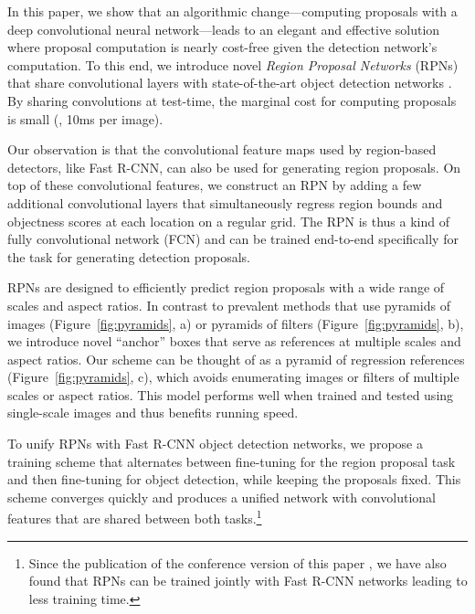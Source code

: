 \documentclass[10pt,journal,cspaper,compsoc]{IEEEtran}
\begin{document}
In this paper, we show that an algorithmic change---computing proposals with a deep convolutional neural network---leads to an elegant and effective solution where proposal computation is nearly cost-free given the detection network's computation.
To this end, we introduce novel \emph{Region Proposal Networks} (RPNs) that share convolutional layers with state-of-the-art object detection networks \cite{He2014,Girshick2015a}. By sharing convolutions at test-time, the marginal cost for computing proposals is small (\eg, 10ms per image).

Our observation is that the convolutional feature maps used by region-based detectors, like Fast R-CNN, can also be used for generating region proposals.
On top of these convolutional features, we construct an RPN by adding a few additional convolutional layers that simultaneously regress region bounds and objectness scores at each location on a regular grid.
The RPN is thus a kind of fully convolutional network (FCN) \cite{Long2015} and can be trained end-to-end specifically for the task for generating detection proposals.

RPNs are designed to efficiently predict region proposals with a wide range of scales and aspect ratios. In contrast to prevalent methods \cite{Felzenszwalb2010,Sermanet2014,He2014,Girshick2015a} that use pyramids of images (Figure~\ref{fig:pyramids}, a) or pyramids of filters (Figure~\ref{fig:pyramids}, b), we introduce novel ``anchor'' boxes that serve as references at multiple scales and aspect ratios. Our scheme can be thought of as a pyramid of regression references (Figure~\ref{fig:pyramids}, c), which avoids enumerating images or filters of multiple scales or aspect ratios. This model performs well when trained and tested using single-scale images and thus benefits running speed.

To unify RPNs with Fast R-CNN \cite{Girshick2015a} object detection networks, we propose a training scheme that alternates between fine-tuning for the region proposal task and then fine-tuning for object detection, while keeping the proposals fixed.
This scheme converges quickly and produces a unified network with convolutional features that are shared between both tasks.\footnote{Since the publication of the conference version of this paper \cite{Ren2015a}, we have also found that RPNs can be trained jointly with Fast R-CNN networks leading to less training time.}
\end{document}

